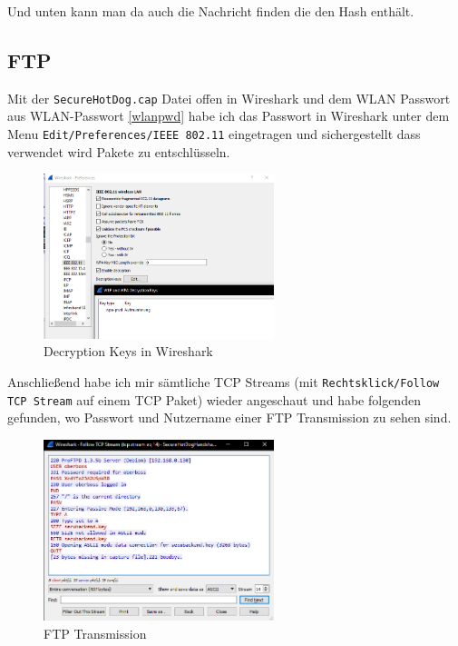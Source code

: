 \documentclass[12pt,a4paper,titlepage,oneside]{scrartcl}
\begin{document}
Und unten kann man da auch die Nachricht finden die den Hash enthält.

\subsection{FTP}

Mit der \lstinline{SecureHotDog.cap} Datei offen in Wireshark und dem WLAN Passwort aus WLAN-Passwort \ref{wlanpwd} habe ich das Passwort in Wireshark unter dem Menu \lstinline{Edit/Preferences/IEEE 802.11} eingetragen und sichergestellt dass verwendet wird Pakete zu entschlüsseln.

\begin{figure}[h!]
  \centering
    \includegraphics[width=0.6\textwidth]{./imgs/intranet_screenshots/ws_decryptionKeys.png}
  \caption{Decryption Keys in Wireshark}
  \label{fig:decryptionKeys}
\end{figure}

Anschließend habe ich mir sämtliche TCP Streams (mit \lstinline{Rechtsklick/Follow TCP Stream} auf einem TCP Paket) wieder angeschaut und habe folgenden gefunden, wo Passwort und Nutzername einer FTP Transmission zu sehen sind.

\begin{figure}[h!]
  \centering
    \includegraphics[width=0.6\textwidth]{./imgs/intranet_screenshots/ws_ftpStream.png}
  \caption{FTP Transmission}
  \label{fig:ftpTransmission}
\end{figure}
\end{document}
